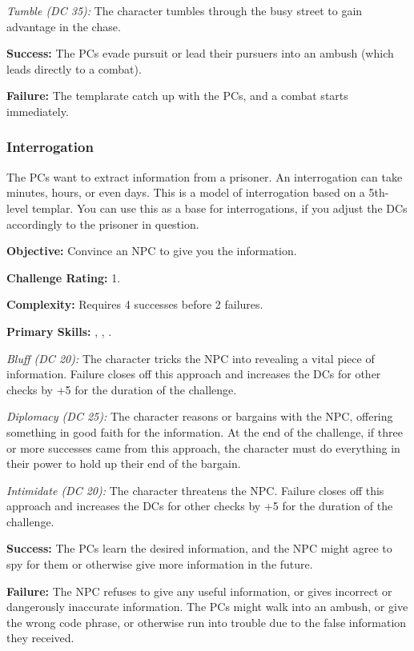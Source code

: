 \textit{Tumble (DC 35):} The character tumbles through the busy street to gain advantage in the chase.

\textbf{Success:} The PCs evade pursuit or lead their pursuers into an ambush (which leads directly to a combat).

\textbf{Failure:} The templarate catch up with the PCs, and a combat starts immediately.


\subsubsection{Interrogation}
The PCs want to extract information from a prisoner. An interrogation can take minutes, hours, or even days. This is a model of interrogation based on a 5th-level templar. You can use this as a base for interrogations, if you adjust the DCs accordingly to the prisoner in question.

\textbf{Objective:} Convince an NPC to give you the information.

\textbf{Challenge Rating:} 1.

\textbf{Complexity:} Requires 4 successes before 2 failures.

\textbf{Primary Skills:} , , .

\textit{Bluff (DC 20):} The character tricks the NPC into revealing a vital piece of information. Failure closes off this approach and increases the DCs for other checks by +5 for the duration of the challenge.

\textit{Diplomacy (DC 25):} The character reasons or bargains with the NPC, offering something in good faith for the information. At the end of the challenge, if three or more successes came from this approach, the character must do everything in their power to hold up their end of the bargain.

\textit{Intimidate (DC 20):} The character threatens the NPC. Failure closes off this approach and increases the DCs for other checks by +5 for the duration of the challenge.

\textbf{Success:} The PCs learn the desired information, and the NPC might agree to spy for them or otherwise give more information in the future.

\textbf{Failure:} The NPC refuses to give any useful information, or gives incorrect or dangerously inaccurate information. The PCs might walk into an ambush, or give the wrong code phrase, or otherwise run into trouble due to the false information they received.
